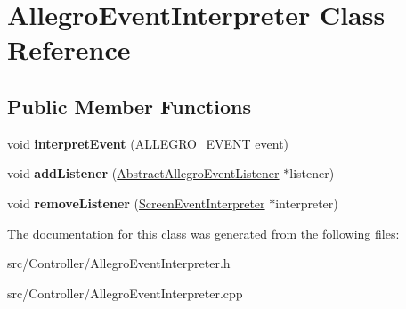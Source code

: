 \hypertarget{classAllegroEventInterpreter}{}\section{Allegro\+Event\+Interpreter Class Reference}
\label{classAllegroEventInterpreter}
\subsection*{Public Member Functions}
\begin{DoxyCompactItemize}
\item 
void {\bfseries interpret\+Event} (A\+L\+L\+E\+G\+R\+O\+\_\+\+E\+V\+E\+NT event)\hypertarget{classAllegroEventInterpreter_a572641b277345083016ce9920fcc8d33}{}\label{classAllegroEventInterpreter_a572641b277345083016ce9920fcc8d33}

\item 
void {\bfseries add\+Listener} (\hyperlink{classAbstractAllegroEventListener}{Abstract\+Allegro\+Event\+Listener} $\ast$listener)\hypertarget{classAllegroEventInterpreter_acf06da41e2c92011bacfe6c6775cc1ee}{}\label{classAllegroEventInterpreter_acf06da41e2c92011bacfe6c6775cc1ee}

\item 
void {\bfseries remove\+Listener} (\hyperlink{classScreenEventInterpreter}{Screen\+Event\+Interpreter} $\ast$interpreter)\hypertarget{classAllegroEventInterpreter_a44f231d861c8d523298c3143bbd7749d}{}\label{classAllegroEventInterpreter_a44f231d861c8d523298c3143bbd7749d}

\end{DoxyCompactItemize}


The documentation for this class was generated from the following files\+:\begin{DoxyCompactItemize}
\item 
src/\+Controller/Allegro\+Event\+Interpreter.\+h\item 
src/\+Controller/Allegro\+Event\+Interpreter.\+cpp\end{DoxyCompactItemize}

